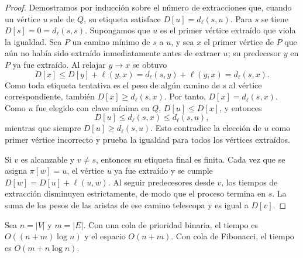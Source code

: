             \begin{proof}
                Demostramos por inducción sobre el número de extracciones que, cuando un vértice $u$ sale de $Q$, su etiqueta satisface $D[u]=d_\ell(s,u)$. Para $s$ se tiene $D[s]=0=d_\ell(s,s)$. Supongamos que $u$ es el primer vértice extraído que viola la igualdad. Sea $P$ un camino mínimo de $s$ a $u$, y sea $x$ el primer vértice de $P$ que aún no había sido extraído inmediatamente antes de extraer $u$; su predecesor $y$ en $P$ ya fue extraído. Al relajar $y\to x$ se obtuvo
                \[
                    D[x]\le D[y]+\ell(y,x)=d_\ell(s,y)+\ell(y,x)=d_\ell(s,x).
                \]
                Como toda etiqueta tentativa es el peso de algún camino de $s$ al vértice correspondiente, también $D[x]\ge d_\ell(s,x)$. Por tanto, $D[x]=d_\ell(s,x)$. Como $u$ fue elegido con clave mínima en $Q$, $D[u]\le D[x]$, y entonces
                \[
                    D[u]\le d_\ell(s,x)\le d_\ell(s,u),
                \]
                mientras que siempre $D[u]\ge d_\ell(s,u)$. Esto contradice la elección de $u$ como primer vértice incorrecto y prueba la igualdad para todos los vértices extraídos.

                Si $v$ es alcanzable y $v\neq s$, entonces su etiqueta final es finita. Cada vez que se asigna $\pi[w]=u$, el vértice $u$ ya fue extraído y se cumple $D[w]=D[u]+\ell(u,w)$. Al seguir predecesores desde $v$, los tiempos de extracción disminuyen estrictamente, de modo que el proceso termina en $s$. La suma de los pesos de las aristas de ese camino telescopa y es igual a $D[v]$.
            \end{proof}

            \begin{proposicion}[Complejidad]
                Sea $n=|V|$ y $m=|E|$. Con una cola de prioridad binaria, el tiempo es $O((n+m)\log n)$ y el espacio $O(n+m)$. Con cola de Fibonacci, el tiempo es $O(m+n\log n)$.
            \end{proposicion}

